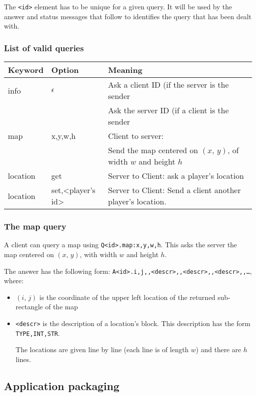 \documentclass{article}
\begin{document}
The \texttt{<id>} element has to be unique for a given query. It will be used
by the answer and status messages that follow to identifies the query that has
been dealt with.

\subsubsection{List of valid queries}
\begin{tabular}{|l|l|l|}
	\hline
	\textbf{Keyword}&\textbf{Option}&Meaning\\\hline
	info&\(\epsilon\)&Ask a client ID (if the server is the sender\\
		 &&Ask the server ID (if a client is the sender\\\hline
	map&x,y,w,h&Client to server:\\
		&& Send the map centered on \((x,\,y)\), of width \(w\) and height
		\(h\)\\\hline
	location & get & Server to Client: ask a player's location\\\hline
	location & set,<player's id> & Server to Client: Send a client another
		player's location.\\\hline
\end{tabular}


\subsubsection{The map query}
A client can query a map using \texttt{Q<id>.map:x,y,w,h}. This asks the server
the map centered on \((x,\,y)\), with width \(w\) and height \(h\).

The answer has the following form:
\texttt{A<id>.i,j,,<descr>,,<descr>,,<descr>,,\dots}, where:
\begin{itemize}
	\item \((i,\,j)\) is the coordinate of the upper left location of the
	returned sub-rectangle of the map
	\item \texttt{<descr>} is the description of a location's block. This
	description has the form \texttt{TYPE,INT,STR}.

	The locations are given line by line (each line is of length \(w\)) and
	there are \(h\) lines.
\end{itemize}

\subsection{Application packaging}
\end{document}
